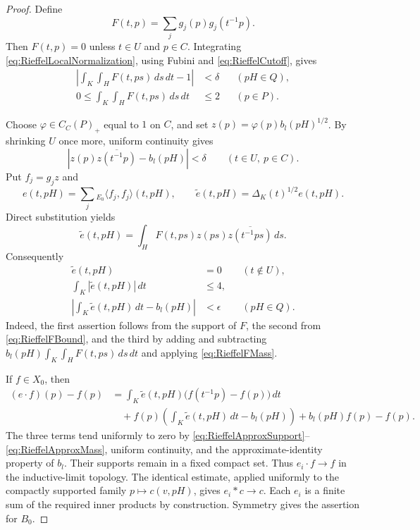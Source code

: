 \documentclass{book}
\begin{document}
\begin{proof}
  Define
  \[
    F(t,p)=\sum_jg_j(p)g_j(t^{-1}p).
  \]
  Then \(F(t,p)=0\) unless \(t\in U\) and \(p\in C\).  Integrating
  \eqref{eq:RieffelLocalNormalization}, using Fubini and
  \eqref{eq:RieffelCutoff}, gives
  \begin{align}
    \left|\int_K\int_HF(t,ps)\,ds\,dt-1\right|&<\delta
      &&(pH\in Q),\label{eq:RieffelFMass}\\
    0\leq\int_K\int_HF(t,ps)\,ds\,dt&\leq2
      &&(p\in P).\label{eq:RieffelFBound}
  \end{align}

  Choose \(\varphi\in C_C(P)_+\) equal to \(1\) on \(C\), and set
  \(z(p)=\varphi(p)b_l(pH)^{1/2}\).  By shrinking \(U\) once more, uniform
  continuity gives
  \[
    |z(p)\overline{z(t^{-1}p)}-b_l(pH)|<\delta
    \qquad(t\in U,\ p\in C).
  \]
  Put \(f_j=g_jz\) and
  \[
    e(t,pH)=\sum_j{}_{E_0}\!\langle f_j,f_j\rangle(t,pH),
    \qquad
    \widetilde e(t,pH)=\Delta_K(t)^{1/2}e(t,pH).
  \]
  Direct substitution yields
  \[
    \widetilde e(t,pH)
      =\int_HF(t,ps)z(ps)\overline{z(t^{-1}ps)}\,ds.
  \]
  Consequently
  \begin{align}
    \widetilde e(t,pH)&=0 &&(t\notin U),\label{eq:RieffelApproxSupport}\\
    \int_K|\widetilde e(t,pH)|\,dt&\leq4,\label{eq:RieffelApproxBound}\\
    \left|\int_K\widetilde e(t,pH)\,dt-b_l(pH)\right|
      &<\epsilon &&(pH\in Q).\label{eq:RieffelApproxMass}
  \end{align}
  Indeed, the first assertion follows from the support of \(F\), the second
  from \eqref{eq:RieffelFBound}, and the third by adding and subtracting
  \(b_l(pH)\int_K\int_HF(t,ps)\,ds\,dt\) and applying
  \eqref{eq:RieffelFMass}.

  If \(f\in X_0\), then
  \begin{align*}
    (e\cdot f)(p)-f(p)
      &=\int_K\widetilde e(t,pH)
        \bigl(f(t^{-1}p)-f(p)\bigr)\,dt\\
      &\quad+f(p)\left(\int_K\widetilde e(t,pH)\,dt-b_l(pH)\right)
        +b_l(pH)f(p)-f(p).
  \end{align*}
  The three terms tend uniformly to zero by
  \eqref{eq:RieffelApproxSupport}--\eqref{eq:RieffelApproxMass}, uniform
  continuity, and the approximate-identity property of \(b_l\).  Their
  supports remain in a fixed compact set.  Thus \(e_i\cdot f\to f\) in the
  inductive-limit topology.  The identical estimate, applied uniformly to
  the compactly supported family \(p\mapsto c(v,pH)\), gives
  \(e_i*c\to c\).  Each \(e_i\) is a finite sum of the required inner
  products by construction.  Symmetry gives the assertion for \(B_0\).
\end{proof}
\end{document}
